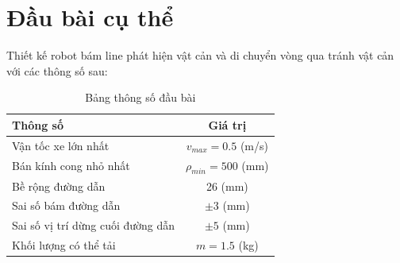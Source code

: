     \section{Đầu bài cụ thể}
    Thiết kế robot bám line phát hiện vật cản và di chuyển vòng qua tránh vật cản với
    các thông số sau:
    \begin{table}[h]
        \centering
        \caption{Bảng thông số đầu bài}
        \begin{tabular}{|l|c|}
        \hline
        \centering \textbf{Thông số} & \textbf{Giá trị} \\
        \hline
        Vận tốc xe lớn nhất & $v_{max} = 0.5$ (m/s) \\
        \hline
        Bán kính cong nhỏ nhất & $\rho_{min} = 500$ (mm) \\
        \hline
        Bề rộng đường dẫn & 26 (mm) \\
        \hline
        Sai số bám đường dẫn & $\pm 3$ (mm) \\
        \hline
        Sai số vị trí dừng cuối đường dẫn & $\pm 5$ (mm) \\
        \hline
        Khối lượng có thể tải & $m = 1.5$ (kg) \\
        \hline
        \end{tabular}
    \end{table}





    
